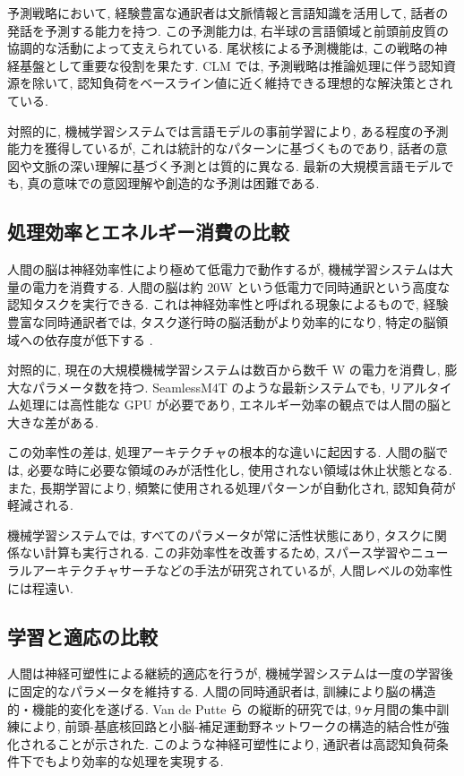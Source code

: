 予測戦略において, 経験豊富な通訳者は文脈情報と言語知識を活用して, 話者の発話を予測する能力を持つ.
この予測能力は, 右半球の言語領域と前頭前皮質の協調的な活動によって支えられている.
尾状核による予測機能は, この戦略の神経基盤として重要な役割を果たす.
CLM では, 予測戦略は推論処理に伴う認知資源を除いて, 認知負荷をベースライン値に近く維持できる理想的な解決策とされている.

対照的に, 機械学習システムでは言語モデルの事前学習により, ある程度の予測能力を獲得しているが, これは統計的なパターンに基づくものであり, 話者の意図や文脈の深い理解に基づく予測とは質的に異なる.
最新の大規模言語モデルでも, 真の意味での意図理解や創造的な予測は困難である.

\subsection{処理効率とエネルギー消費の比較}

人間の脳は神経効率性により極めて低電力で動作するが, 機械学習システムは大量の電力を消費する.
人間の脳は約 20W という低電力で同時通訳という高度な認知タスクを実行できる.
これは神経効率性と呼ばれる現象によるもので, 経験豊富な同時通訳者では, タスク遂行時の脳活動がより効率的になり, 特定の脳領域への依存度が低下する \cite{hervais2015plasticity} .

対照的に, 現在の大規模機械学習システムは数百から数千 W の電力を消費し, 膨大なパラメータ数を持つ.
SeamlessM4T \cite{seamless2023m4t} のような最新システムでも, リアルタイム処理には高性能な GPU が必要であり, エネルギー効率の観点では人間の脳と大きな差がある.

この効率性の差は, 処理アーキテクチャの根本的な違いに起因する.
人間の脳では, 必要な時に必要な領域のみが活性化し, 使用されない領域は休止状態となる.
また, 長期学習により, 頻繁に使用される処理パターンが自動化され, 認知負荷が軽減される.

機械学習システムでは, すべてのパラメータが常に活性状態にあり, タスクに関係ない計算も実行される.
この非効率性を改善するため, スパース学習やニューラルアーキテクチャサーチなどの手法が研究されているが, 人間レベルの効率性には程遠い.

\subsection{学習と適応の比較}

人間は神経可塑性による継続的適応を行うが, 機械学習システムは一度の学習後に固定的なパラメータを維持する.
人間の同時通訳者は, 訓練により脳の構造的・機能的変化を遂げる.
Van de Putte ら \cite{vandeputte2018anatomical} の縦断的研究では, 9ヶ月間の集中訓練により, 前頭-基底核回路と小脳-補足運動野ネットワークの構造的結合性が強化されることが示された.
このような神経可塑性により, 通訳者は高認知負荷条件下でもより効率的な処理を実現する.

